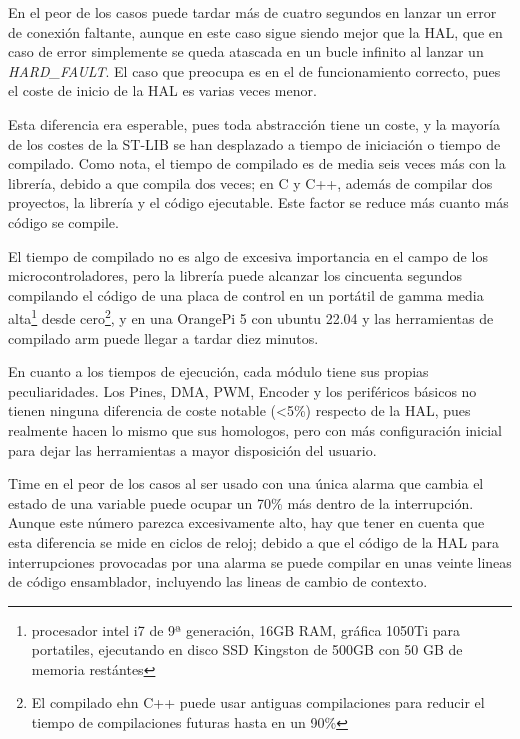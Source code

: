 \documentclass{report}
\begin{document}
En el peor de los casos puede tardar más de cuatro segundos en lanzar un error de conexión faltante, aunque en este caso sigue siendo mejor que la HAL, que en caso de error simplemente se queda atascada en un bucle infinito al lanzar un \textit{HARD\_FAULT}. El caso que preocupa es en el de funcionamiento correcto, pues el coste de inicio de la HAL es varias veces menor.
\par
Esta diferencia era esperable, pues toda abstracción tiene un coste, y la mayoría de los costes de la ST-LIB se han desplazado a tiempo de iniciación o tiempo de compilado. Como nota, el tiempo de compilado es de media seis veces más con la librería, debido a que compila dos veces; en C y C++, además de compilar dos proyectos, la librería y el código ejecutable. Este factor se reduce más cuanto más código se compile. 
\par \vspace{0.3cm}
El tiempo de compilado no es algo de excesiva importancia en el campo de los microcontroladores, pero la librería puede alcanzar los cincuenta segundos compilando el código de una placa de control\cite{web:github:TCU} en un portátil de gamma media alta\footnote{procesador intel i7 de 9ª generación, 16GB RAM, gráfica 1050Ti para portatiles, ejecutando en disco SSD Kingston de 500GB con 50 GB de memoria restántes} desde cero\footnote{El compilado ehn C++ puede usar antiguas compilaciones para reducir el tiempo de compilaciones futuras hasta en un 90\%}, y en una OrangePi 5 con ubuntu 22.04 y las herramientas de compilado arm puede llegar a tardar diez minutos. 
\par \vspace{0.3cm}
En cuanto a los tiempos de ejecución, cada módulo tiene sus propias peculiaridades. Los Pines, DMA, PWM, Encoder y los periféricos básicos no tienen ninguna diferencia de coste notable (<5\%) respecto de la HAL, pues realmente hacen lo mismo que sus homologos, pero con más configuración inicial para dejar las herramientas a mayor disposición del usuario.
\par 
Time en el peor de los casos al ser usado con una única alarma que cambia el estado de una variable puede ocupar un 70\% más dentro de la interrupción. Aunque este número parezca excesivamente alto, hay que tener en cuenta que esta diferencia se mide en ciclos de reloj; debido a que el código de la HAL para interrupciones provocadas por una alarma se puede compilar en unas veinte lineas de código ensamblador, incluyendo las lineas de cambio de contexto. 
\par \vspace{0.3cm}
\end{document}
